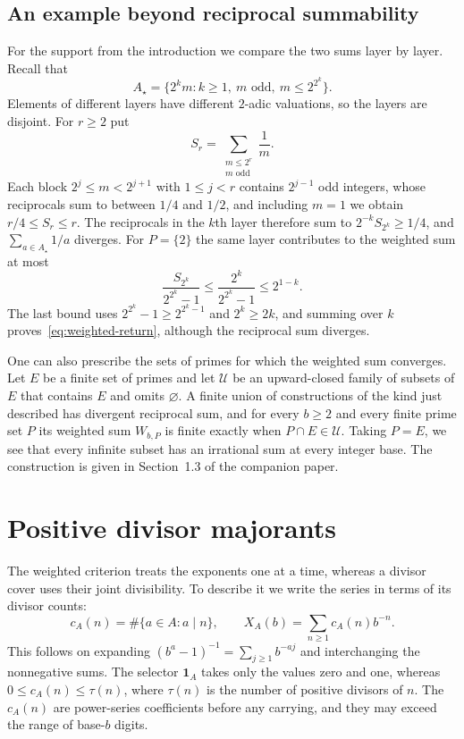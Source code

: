 \documentclass[11pt]{article}
\begin{document}
\subsection{An example beyond reciprocal summability}
For the support from the introduction we compare the two sums layer by
layer. Recall that
\[
 A_\star=\{2^k m:k\ge1,\ m\text{ odd},\ m\le2^{2^k}\}.
\]
Elements of different layers have different $2$-adic valuations, so the
layers are disjoint. For $r\ge2$ put
\[
 S_r=\sum_{\substack{m\le2^r\\m\text{ odd}}}\frac1m.
\]
Each block $2^j\le m<2^{j+1}$ with $1\le j<r$ contains $2^{j-1}$ odd
integers, whose reciprocals sum to between $1/4$ and $1/2$, and
including $m=1$ we obtain $r/4\le S_r\le r$. The reciprocals in the
$k$th layer therefore sum to $2^{-k}S_{2^k}\ge1/4$, and
$\sum_{a\in A_\star}1/a$ diverges. For $P=\{2\}$ the same layer
contributes to the weighted sum at most
\[
 \frac{S_{2^k}}{2^{2^k}-1}
 \le\frac{2^k}{2^{2^k}-1}
 \le2^{1-k}.
\]
The last bound uses $2^{2^k}-1\ge2^{2^k-1}$ and $2^k\ge2k$, and
summing over $k$ proves~\eqref{eq:weighted-return}, although the
reciprocal sum diverges.


One can also prescribe the sets of primes for which the weighted sum
converges. Let $E$ be a finite set of primes and let $\mathcal U$ be
an upward-closed family of subsets of $E$ that contains $E$ and omits
$\varnothing$. A finite union of constructions of the kind just
described has divergent reciprocal sum, and for every $b\ge2$ and every
finite prime set $P$ its weighted sum $W_{b,P}$ is finite exactly when
$P\cap E\in\mathcal U$. Taking $P=E$, we see that every infinite subset
has an irrational sum at every integer base. The construction is given
in
{Section~1.3 of the companion paper}.

\section{Positive divisor majorants}\label{sec:common-kernel}
The weighted criterion treats the exponents one at a time, whereas a
divisor cover uses their joint divisibility. To describe it we write
the series in terms of its divisor counts:
\begin{equation}
 c_A(n)=\#\{a\in A:a\mid n\},\qquad
 X_A(b)=\sum_{n\ge1}c_A(n)b^{-n}.
 \label{eq:incidence}
\end{equation}
This follows on expanding $(b^a-1)^{-1}=\sum_{j\ge1}b^{-aj}$ and
interchanging the nonnegative sums. The selector $\mathbf1_A$ takes
only the values zero and one, whereas $0\le c_A(n)\le\tau(n)$, where
$\tau(n)$ is the number of positive divisors of $n$. The $c_A(n)$ are
power-series coefficients before any carrying, and they may exceed the
range of base-$b$ digits.
\end{document}
